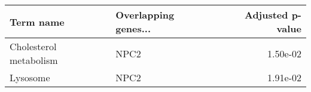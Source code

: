 \begin{tabular}{llr}
\toprule
             Term name & Overlapping genes... &  Adjusted p-value \\
\midrule
Cholesterol metabolism &                 NPC2 &          1.50e-02 \\
              Lysosome &                 NPC2 &          1.91e-02 \\
\bottomrule
\end{tabular}
